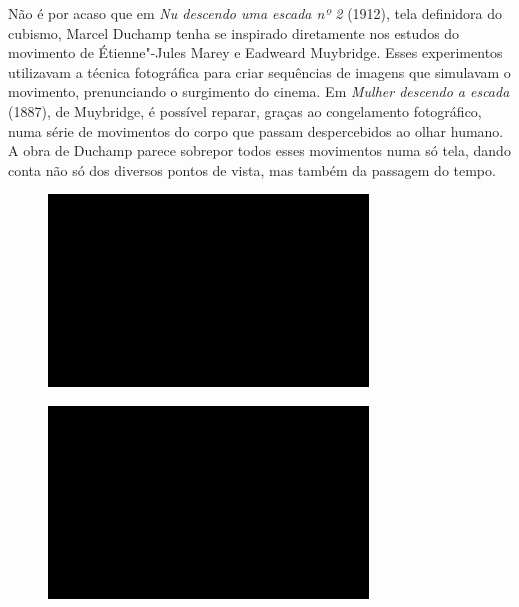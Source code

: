 Não é por acaso que em \emph{Nu descendo uma escada nº 2} (1912), tela
definidora do cubismo, Marcel Duchamp tenha se inspirado diretamente nos
estudos do movimento de Étienne"-Jules Marey e Eadweard Muybridge. Esses
experimentos utilizavam a técnica fotográfica para criar sequências de
imagens que simulavam o movimento, prenunciando o surgimento do cinema.
Em \emph{Mulher descendo a escada} (1887), de Muybridge, é possível
reparar, graças ao congelamento fotográfico, numa série de movimentos do
corpo que passam despercebidos ao olhar humano. A obra de Duchamp parece
sobrepor todos esses movimentos numa só tela, dando conta não só dos
diversos pontos de vista, mas também da passagem do tempo.

\begin{figure}[!ht]

\centering
 \includegraphics[width=85mm]{./imgs/im1.jpg}
\caption{\tiny{}}

\end{figure}

\begin{figure}[!ht]

\centering
 \includegraphics[width=85mm]{./imgs/im1.jpg}
\caption{\tiny{}}

\end{figure}


